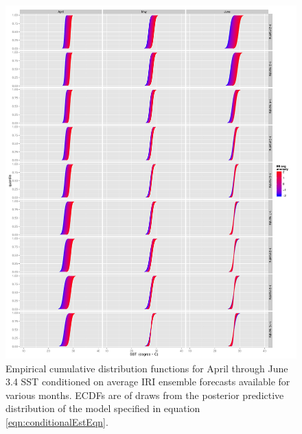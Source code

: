 \documentclass[article]{jss}
\begin{document}
\begin{figure}[!htbp]
\begin{center}
  \includegraphics[width=\linewidth, keepaspectratio]{img/conditionalCDFs04to06TraditionalCDFconfig.pdf}
  \caption{Empirical cumulative distribution functions for April through June  3.4 SST conditioned on average IRI ensemble forecasts available for various months. ECDFs are of draws from the posterior predictive distribution of the model specified in equation \ref{eqn:conditionalEstEqn}.}
   \label{fig:conditionalCDFs04to06}
   \end{center}
\end{figure}
\end{document}
